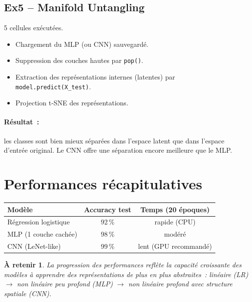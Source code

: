 \documentclass[a4paper,11pt]{article}
\newtheorem*{important}{\`A retenir}
\begin{document}
\subsection{Ex5 -- Manifold Untangling}

5 cellules ex\'ecut\'ees.

\begin{itemize}
  \item Chargement du MLP (ou CNN) sauvegard\'e.
  \item Suppression des couches hautes par \texttt{pop()}.
  \item Extraction des repr\'esentations internes (latentes)
    par \texttt{model.predict(X\_test)}.
  \item Projection t-SNE des repr\'esentations.
\end{itemize}

\paragraph{R\'esultat~:} les classes sont bien mieux s\'epar\'ees
dans l'espace latent que dans l'espace d'entr\'ee original.
Le CNN offre une s\'eparation encore meilleure que le MLP.

\section{Performances r\'ecapitulatives}

\begin{center}
\begin{tabular}{lcc}
\toprule
Mod\`ele & Accuracy test & Temps (20 \'epoques) \\
\midrule
R\'egression logistique & 92\,\% & rapide (CPU) \\
MLP (1 couche cach\'ee) & 98\,\% & mod\'er\'e \\
CNN (LeNet-like) & 99\,\% & lent (GPU recommand\'e) \\
\bottomrule
\end{tabular}
\end{center}

\begin{important}
  La progression des performances refl\`ete la capacit\'e
  croissante des mod\`eles \`a apprendre des repr\'esentations
  de plus en plus abstraites~: lin\'eaire (LR) $\rightarrow$
  non lin\'eaire peu profond (MLP) $\rightarrow$ non lin\'eaire
  profond avec structure spatiale (CNN).
\end{important}
\end{document}
